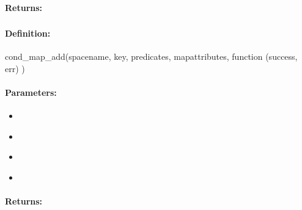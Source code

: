 \paragraph{Returns:}


\pagebreak
\subsubsection{}
\label{api:nodejs:cond_map_add}


\paragraph{Definition:}
\begin{javascriptcode}
cond_map_add(spacename, key, predicates, mapattributes, function (success, err) {})
\end{javascriptcode}
\paragraph{Parameters:}
\begin{itemize}[noitemsep]
\item {}\\

\item {}\\

\item {}\\

\item {}\\

\end{itemize}

\paragraph{Returns:}


\pagebreak
\subsubsection{}
\label{api:nodejs:map_remove}



